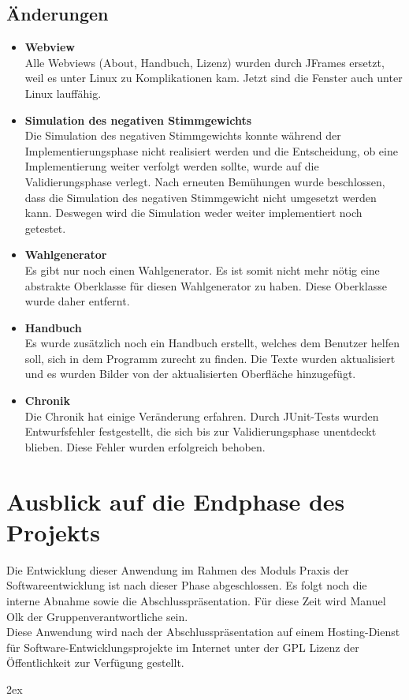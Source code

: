 \documentclass[12pt,a4paper,titlepage]{article}
\begin{document}
\subsection{Änderungen}
\begin{itemize}


\item{\bf{Webview}}\\
Alle Webviews (About, Handbuch, Lizenz) wurden durch JFrames ersetzt, weil es unter Linux zu Komplikationen kam. Jetzt sind die Fenster auch unter Linux lauffähig.\\

\item{\bf{Simulation des negativen Stimmgewichts}}\\
Die Simulation des negativen Stimmgewichts konnte während der Implementierungsphase nicht realisiert werden und die Entscheidung, ob eine Implementierung weiter verfolgt werden sollte, wurde auf die Validierungsphase verlegt. Nach erneuten Bemühungen wurde beschlossen, dass die Simulation des negativen Stimmgewicht nicht umgesetzt werden kann. Deswegen wird die Simulation weder weiter implementiert noch getestet.

\item{\bf{Wahlgenerator}}\\
Es gibt nur noch einen Wahlgenerator. Es ist somit nicht mehr nötig eine abstrakte Oberklasse für diesen Wahlgenerator zu haben. Diese Oberklasse wurde daher entfernt.

\item{\bf{Handbuch}}\\
Es wurde zusätzlich noch ein Handbuch erstellt, welches dem Benutzer helfen soll, sich in dem Programm zurecht zu finden. Die Texte wurden aktualisiert und es wurden Bilder von der aktualisierten Oberfläche hinzugefügt. 

\item{\bf{Chronik}}\\

Die Chronik hat einige Veränderung erfahren. Durch JUnit-Tests wurden Entwurfsfehler festgestellt, die sich bis zur Validierungsphase unentdeckt blieben. Diese Fehler wurden erfolgreich behoben.

\end{itemize}

\section{Ausblick auf die Endphase des Projekts}
Die Entwicklung dieser Anwendung im Rahmen des Moduls Praxis der Softwareentwicklung ist nach dieser Phase abgeschlossen. Es folgt noch die interne Abnahme sowie die Abschlusspräsentation. Für diese Zeit wird Manuel Olk der Gruppenverantwortliche sein.\\

Diese Anwendung wird nach der Abschlusspräsentation auf einem Hosting-Dienst für Software-Entwicklungsprojekte im Internet unter der GPL Lizenz der Öffentlichkeit zur Verfügung gestellt.

\begingroup
\parindent 0pt
\parskip 2ex
\def\enotesize{\normalsize}

\endgroup
\end{document}
